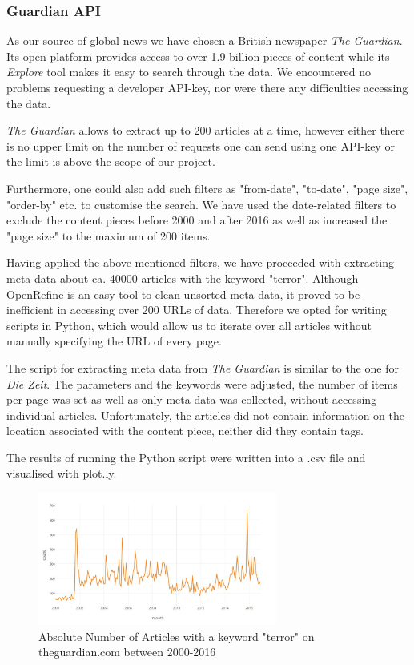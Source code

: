 \subsubsection{Guardian API}
\label{sec:guardian-api}

As our source of global news we have chosen a British newspaper \textit{The Guardian}. Its open platform provides access to over 1.9 billion pieces of content while its \textit{Explore} tool makes it easy to search through the data. We encountered no problems requesting a developer API-key, nor were there any difficulties accessing the data. 

\textit{The Guardian} allows to extract up to 200 articles at a time, however either there is no upper limit on the number of requests one can send using one API-key or the limit is above the scope of our project.

Furthermore, one could also add such filters as "from-date", "to-date", "page size", "order-by" etc. to customise the search. We have used the date-related filters to exclude the content pieces before 2000 and after 2016 as well as increased the "page size" to the maximum of 200 items. 

Having applied the above mentioned filters, we have proceeded with extracting meta-data about ca. 40000 articles with the keyword "terror". Although OpenRefine is an easy tool to clean unsorted meta data, it proved to be inefficient in accessing over 200 URLs of data. Therefore we opted for writing scripts in Python, which would allow us to iterate over all articles without manually specifying the URL of every page. 

The script for extracting meta data from \textit{The Guardian} is similar to the one for \textit{Die Zeit}. The parameters and the keywords were adjusted, the number of items per page was set as well as only meta data was collected, without accessing individual articles. Unfortunately, the articles did not contain information on the location associated with the content piece, neither did they contain tags. 

The results of running the Python script were written into a .csv file and visualised with plot.ly.

\begin{figure}[h]
  \centering
  \includegraphics[width=0.7\textwidth]{images/guardian/graph_guardian_articles}
  \caption{Absolute Number of Articles with a keyword "terror" on theguardian.com between 2000-2016}
  \label{fig:guardian_total_number_of_articles}
\end{figure}


